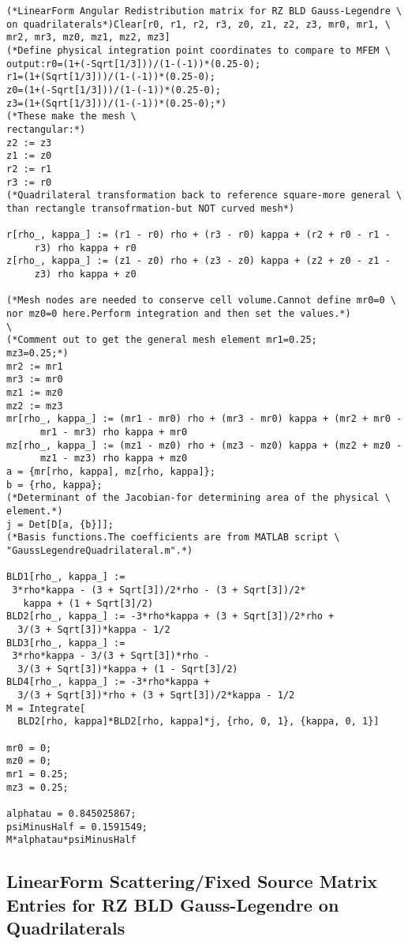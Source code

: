 \documentclass{article}
\begin{document}
\begin{verbatim}
(*LinearForm Angular Redistribution matrix for RZ BLD Gauss-Legendre \
on quadrilaterals*)Clear[r0, r1, r2, r3, z0, z1, z2, z3, mr0, mr1, \
mr2, mr3, mz0, mz1, mz2, mz3]
(*Define physical integration point coordinates to compare to MFEM \
output:r0=(1+(-Sqrt[1/3]))/(1-(-1))*(0.25-0);
r1=(1+(Sqrt[1/3]))/(1-(-1))*(0.25-0);
z0=(1+(-Sqrt[1/3]))/(1-(-1))*(0.25-0);
z3=(1+(Sqrt[1/3]))/(1-(-1))*(0.25-0);*)
(*These make the mesh \
rectangular:*)
z2 := z3
z1 := z0
r2 := r1
r3 := r0
(*Quadrilateral transformation back to reference square-more general \
than rectangle transofrmation-but NOT curved mesh*)

r[rho_, kappa_] := (r1 - r0) rho + (r3 - r0) kappa + (r2 + r0 - r1 - 
     r3) rho kappa + r0
z[rho_, kappa_] := (z1 - z0) rho + (z3 - z0) kappa + (z2 + z0 - z1 - 
     z3) rho kappa + z0

(*Mesh nodes are needed to conserve cell volume.Cannot define mr0=0 \
nor mz0=0 here.Perform integration and then set the values.*)
\
(*Comment out to get the general mesh element mr1=0.25;
mz3=0.25;*)
mr2 := mr1
mr3 := mr0
mz1 := mz0
mz2 := mz3
mr[rho_, kappa_] := (mr1 - mr0) rho + (mr3 - mr0) kappa + (mr2 + mr0 -
      mr1 - mr3) rho kappa + mr0
mz[rho_, kappa_] := (mz1 - mz0) rho + (mz3 - mz0) kappa + (mz2 + mz0 -
      mz1 - mz3) rho kappa + mz0
a = {mr[rho, kappa], mz[rho, kappa]};
b = {rho, kappa};
(*Determinant of the Jacobian-for determining area of the physical \
element.*)
j = Det[D[a, {b}]];
(*Basis functions.The coefficients are from MATLAB script \
"GaussLegendreQuadrilateral.m".*)

BLD1[rho_, kappa_] := 
 3*rho*kappa - (3 + Sqrt[3])/2*rho - (3 + Sqrt[3])/2*
   kappa + (1 + Sqrt[3]/2)
BLD2[rho_, kappa_] := -3*rho*kappa + (3 + Sqrt[3])/2*rho + 
  3/(3 + Sqrt[3])*kappa - 1/2
BLD3[rho_, kappa_] := 
 3*rho*kappa - 3/(3 + Sqrt[3])*rho - 
  3/(3 + Sqrt[3])*kappa + (1 - Sqrt[3]/2)
BLD4[rho_, kappa_] := -3*rho*kappa + 
  3/(3 + Sqrt[3])*rho + (3 + Sqrt[3])/2*kappa - 1/2
M = Integrate[
  BLD2[rho, kappa]*BLD2[rho, kappa]*j, {rho, 0, 1}, {kappa, 0, 1}]

mr0 = 0;
mz0 = 0;
mr1 = 0.25;
mz3 = 0.25;

alphatau = 0.845025867;
psiMinusHalf = 0.1591549;
M*alphatau*psiMinusHalf
\end{verbatim}

\subsection{LinearForm Scattering/Fixed Source Matrix Entries for RZ BLD Gauss-Legendre on Quadrilaterals}
\end{document}
